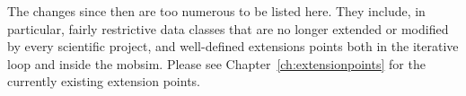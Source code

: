 The changes since then are too numerous to be listed here.  They include, in particular, fairly restrictive data classes that are no longer extended or modified by every scientific project, and well-defined extensions points both in the iterative loop and inside the \gls{mobsim}.  Please see Chapter~\ref{ch:extensionpoints} for the currently existing extension points.




